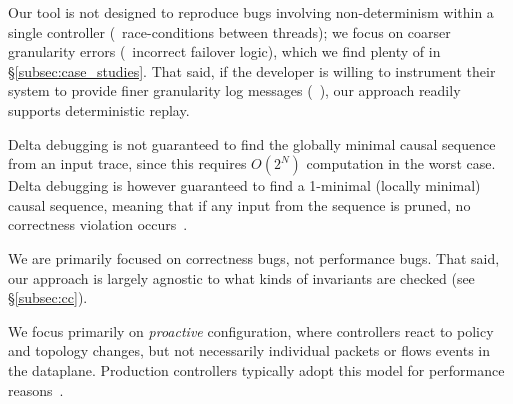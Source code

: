  Our tool is not designed to reproduce bugs
involving non-determinism within a single controller (\eg~race-conditions between threads);
we focus on coarser granularity errors (\eg~incorrect failover logic), which we find plenty of
in \S\ref{subsec:case_studies}.
That said, if the developer is willing to instrument their system to
provide finer granularity log messages (\cf~\cite{Geels:2006:RDD:1267359.1267386}),
our approach readily supports deterministic replay.

Delta debugging is not guaranteed to find the globally minimal
causal sequence from an input trace, since this requires $O(2^N)$ computation in the worst case.
Delta debugging is however guaranteed to find a 1-minimal (locally minimal) causal sequence,
meaning that if any input from the sequence is pruned, no correctness violation
occurs~\cite{Zeller:2002:SIF:506201.506206}. 

We are primarily focused on correctness bugs, not performance bugs. That said,
our approach is largely agnostic to what kinds of invariants are
checked (see \S\ref{subsec:cc}).

 We focus primarily on
\emph{proactive} configuration, where controllers react to policy and topology changes, but
 not necessarily individual packets or flows events in the dataplane.
Production controllers typically adopt this model for performance reasons~\cite{nicira}.



